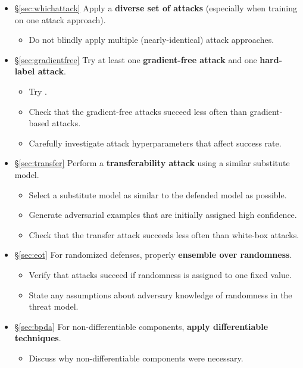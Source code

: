 \documentclass{article} %
\begin{document}
\begin{itemize}[leftmargin=*]
\item \S\ref{sec:whichattack} Apply a \textbf{diverse set of attacks} (especially when training on one attack approach).
  \begin{itemize}[leftmargin=*]
  \item Do not blindly apply multiple (nearly-identical) attack approaches.
  \end{itemize}
\item \S\ref{sec:gradientfree} Try at least one \textbf{gradient-free attack} and one \textbf{hard-label attack}.
  \begin{itemize}[leftmargin=*]
  \item Try \cite{chen2017zoo,uesato2018adversarial,ilyas2018black,brendel2017decision}.
  \item Check that the gradient-free attacks succeed less often than gradient-based attacks.
  \item Carefully investigate attack hyperparameters that affect success rate.
  \end{itemize}
\item \S\ref{sec:transfer} Perform a \textbf{transferability attack} using a similar substitute model.
  \begin{itemize}[leftmargin=*]
    \item Select a substitute model as similar to the defended model as possible.
    \item Generate adversarial examples that are initially assigned high confidence.
    \item Check that the transfer attack succeeds less often than white-box attacks.
  \end{itemize}
\item \S\ref{sec:eot} For randomized defenses, properly \textbf{ensemble over randomness}.
  \begin{itemize}[leftmargin=*]
  \item Verify that attacks succeed if randomness is assigned to one fixed value.
  \item State any assumptions about adversary knowledge of randomness in the threat model.
  \end{itemize}
\item \S\ref{sec:bpda} For non-differentiable components, \textbf{apply differentiable techniques}.
  \begin{itemize}[leftmargin=*]
  \item Discuss why non-differentiable components were necessary.

\end{itemize}
\end{itemize}
\end{document}
